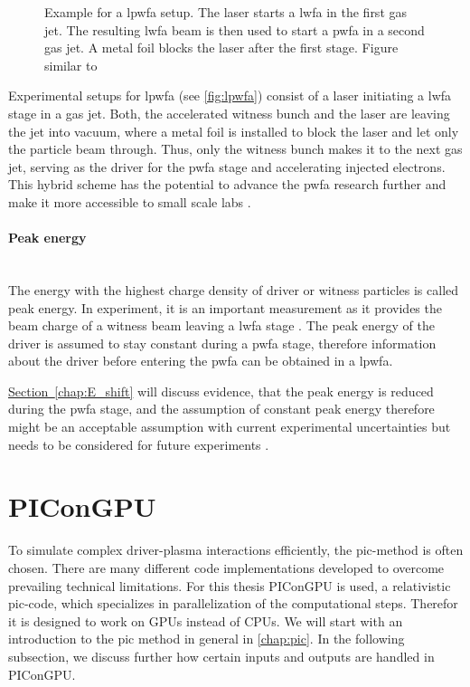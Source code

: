 \documentclass[bachelor_thesis]{subfiles}
\begin{document}
\begin{figure}
	\centering
	
	\caption{Example for a \gls{lpwfa} setup. The laser starts a \gls{lwfa} in the first gas jet. The resulting \gls{lwfa} beam is then used to start a \gls{pwfa} in a second gas jet. A metal foil blocks the laser after the first stage. Figure similar to \cite{Ossa2019}}
	\label{fig:lpwfa}
\end{figure} 
Experimental setups for \gls{lpwfa} (see \autoref{fig:lpwfa}) consist of a laser initiating a \gls{lwfa} stage in a gas jet. 
Both, the accelerated witness bunch and the laser are leaving the jet into vacuum, where a metal foil is installed to block the laser and let only the particle beam through. 
Thus, only the witness bunch makes it to the next gas jet, serving as the driver for the \gls{pwfa} stage and accelerating injected electrons.
This hybrid scheme has the potential to advance the \gls{pwfa} research further and make it more accessible to small scale labs \cite{Kurz2021}.

\paragraph*{Peak energy}\hspace{0pt} \\
The energy with the highest charge density of driver or witness particles is called peak energy. In experiment, it is an important measurement as it provides the beam charge of a witness beam leaving a \gls{lwfa} stage \cite{Schoebel2022}.
The peak energy of the driver is assumed to stay constant during a \gls{pwfa} stage, therefore information about the driver before entering the \gls{pwfa} can be obtained in a \gls{lpwfa}.

\hyperref[chap:E_shift]{Section~\ref*{chap:E_shift}} will discuss evidence, that the peak energy is reduced during the \gls{pwfa} stage, and the assumption of constant peak energy therefore might be an acceptable assumption 
with current experimental uncertainties but needs to be considered for future experiments .


\section{PIConGPU}
To simulate complex driver-plasma interactions efficiently, the \acrfull{pic}-method is often chosen. There are many different code implementations developed to overcome prevailing technical limitations. For this thesis PIConGPU \cite{PIConGPU2013, PICRepo} is used, 
a relativistic \gls{pic}-code, which specializes in parallelization of the computational steps. Therefor it is designed to work on GPUs instead of CPUs. We will start with an introduction to the \gls{pic} method in general in \autoref{chap:pic}.
In the following subsection, we discuss further how certain inputs and outputs are handled in PIConGPU.
\end{document}
